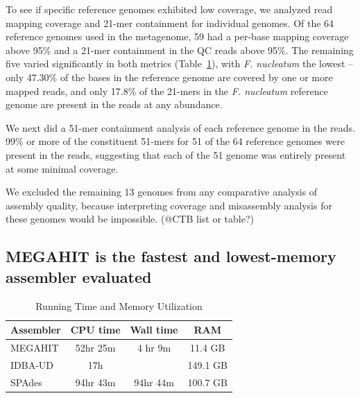 \documentclass[10pt,a4paper,twocolumn]{article}
\begin{document}


To see if specific reference genomes exhibited low coverage, we
analyzed read mapping coverage and 21-mer containment for individual
genomes.  Of the 64 reference genomes used in the metagenome, 59 had a
per-base mapping coverage above 95\% and a 21-mer containment in the
QC reads above 95\%.  The remaining five varied significantly in both
metrics (Table~\ref{table:time-memory}), with {\em F. nucleatum} the
lowest -- only 47.30\% of the bases in the reference genome are
covered by one or more mapped reads, and only 17.8\% of the 21-mers in
the {\em F. nucleatum} reference genome are present in the reads at
any abundance.


We next did a 51-mer containment analysis of each reference genome in
the reads.  99\% or more of the constituent 51-mers for 51 of the 64
reference genomes were present in the reads, suggesting that each
of the 51 genome was entirely present at some minimal coverage.

We excluded the remaining 13 genomes from any comparative
analysis of assembly quality, because interpreting coverage and
misassembly analysis for these genomes would be impossible.
(@CTB list or table?)



\subsection*{MEGAHIT is the fastest and lowest-memory assembler evaluated}

 \begin{table}[h]
\caption{Running Time and Memory Utilization}
\centering
\begin{tabular}{|l|c|c|c|}
\hline
\textbf{Assembler} & \textbf{CPU time} & \textbf{Wall time} & \textbf{RAM} \\ [0.5ex]
\hline
MEGAHIT & 52hr 25m & 4 hr 9m & 11.4 GB \\
\hline
IDBA-UD & 17h & & 149.1 GB \\
\hline
SPAdes & 94hr 43m & 94hr 44m & 100.7 GB \\
\hline

\end{tabular}
\label{table:time-memory}
\end{table}
\end{document}
